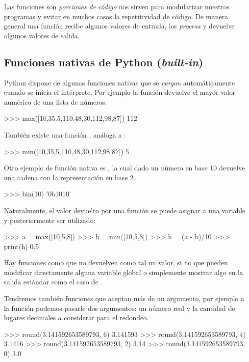 Las funciones son \textit{porciones de código} nos sirven para modularizar 
nuestros programas y evitar en muchos casos la repetitividad de código. 
De manera general una función recibe algunos valores de entrada, los \textit{procesa} y 
devuelve algunos valores de salida. 

\subsection{Funciones nativas de Python (\textit{built-in})}

Python dispone de algunas funciones nativas que se \textit{cargan} automáticamente cuando se 
inicia el intérprete. Por ejemplo la función  devuelve el mayor valor numérico de 
una lista de números:

\begin{python}
>>> max([10,35,5,110,48,30,112,98,87])
112
\end{python}

También existe una función , análoga a :

\begin{python}
>>> min([10,35,5,110,48,30,112,98,87])
5
\end{python}

Otro ejemplo de función nativa es , la cual dado un número en base 10 devuelve 
una cadena con la representación en base 2.

\begin{python}
>>> bin(10)
'0b1010'
\end{python}

Naturalmente, el valor devuelto por una función se puede asignar a una variable y posteriormente ser utilizado:

\begin{python}
>>> a = max([10,5,8])
>>> b = min([10,5,8])
>>> h = (a - b)/10
>>> print(h)
0.5
\end{python}

Hay funciones como  que no devuelven como tal un valor, si no que pueden modificar directamente 
alguna variable global o simplemente mostrar algo en la salida estándar como el caso de .

Tendremos también funciones que aceptan más de un argumento, por ejemplo a la función  podemos 
pasarle dos argumentos: un número real y la cantidad de lugares decimales a considerar para el redondeo.

\begin{python}
>>> round(3.141592653589793, 6)
3.141593
>>> round(3.141592653589793, 4)
3.1416
>>> round(3.141592653589793, 2)
3.14
>>> round(3.141592653589793, 0)
3.0
\end{python}



